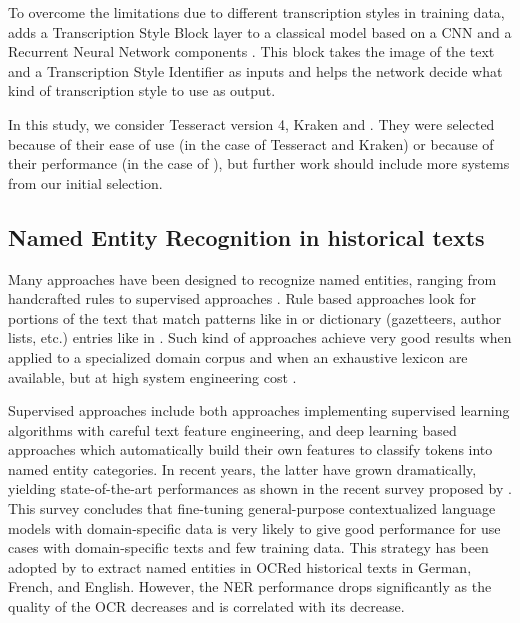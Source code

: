 To overcome the limitations due to different transcription styles in training data, \peroocr adds a Transcription Style Block layer to a classical model based on a CNN and a Recurrent Neural Network components \cite{kohut2021ts}.
This block takes the image of the text and a Transcription Style Identifier as inputs and helps the network decide what kind of transcription style to use as output.

In this study, we consider Tesseract version 4, Kraken and \peroocr.
They were selected because of their ease of use (in the case of Tesseract and Kraken)
or because of their performance (in the case of \peroocr),
but further work should include more systems from our initial selection.




\subsection{Named Entity Recognition in historical texts}
\label{subsection:stoa-ner-on-historical-texts}

Many approaches have been designed to recognize named entities, ranging from handcrafted rules to supervised approaches \cite{nadeau2007}.
Rule based approaches look for portions of the text that match patterns like in \cite{bell2020automated,nouvel2011} or dictionary (gazetteers, author lists, etc.) entries like in \cite{mansouri2008,maurel2011}.
Such kind of approaches achieve very good results when applied to a specialized domain corpus and when an exhaustive lexicon are available, but at high system engineering cost \cite{nadeau2007}. 

Supervised approaches include both approaches implementing supervised learning algorithms with careful text feature engineering, and deep learning based approaches which automatically build their own features to classify tokens into named entity categories.
In recent years, the latter have grown dramatically, yielding state-of-the-art performances as shown in the recent survey proposed by \cite{li2020}. This survey concludes that fine-tuning general-purpose contextualized language models with domain-specific data is very likely to give good performance for use cases with domain-specific texts and few training data. This strategy has been adopted by \cite{Labusch2020NamedED} to extract named entities in OCRed historical texts in German, French, and English. However, the NER performance drops significantly as the quality of the OCR decreases and is correlated with its decrease.

